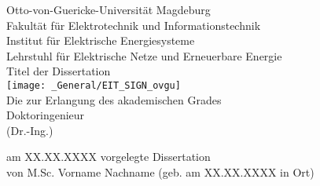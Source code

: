 %
\begin{titlepage}
    \begin{center}
        \normalsize
        Otto-von-Guericke-Universität Magdeburg \\
        Fakultät für Elektrotechnik und Informationstechnik \\
        Institut für Elektrische Energiesysteme \\
        Lehrstuhl für Elektrische Netze und Erneuerbare Energie \\
        \vspace{1cm} %
        \huge
        Titel der Dissertation \\
        \vspace{1.5cm} %
        \texttt{[image: \_General/EIT\_SIGN\_ovgu]} \\
        \vspace{1cm} %
   	\normalsize	
   	Die zur Erlangung des akademischen Grades \\
   	\vspace{1cm} %
        \Large
        Doktoringenieur \\
        (Dr.-Ing.) \\
        \vspace{1cm} %
   \end{center}
    \vfill    
    \normalsize
    am XX.XX.XXXX vorgelegte Dissertation \\
    von M.Sc. Vorname Nachname (geb. am XX.XX.XXXX in Ort) \\
\end{titlepage}
